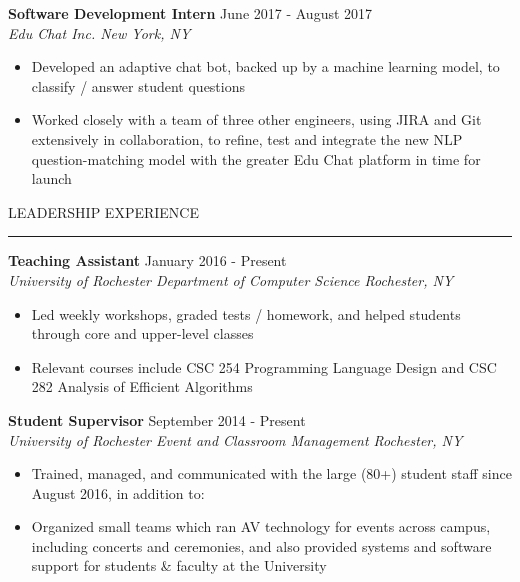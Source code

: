 \documentclass{report}
\begin{document}
\vspace{8pt} \textbf{Software Development Intern} \hfill June 2017 - August 2017 \\
\textit{Edu Chat Inc. \hfill New York, NY}
\begin{itemize} [noitemsep,topsep=4pt] %
	\item Developed an adaptive chat bot, backed up by a machine learning model, to classify / answer student questions
	\item Worked closely with a team of three other engineers, using JIRA and Git extensively in collaboration, to refine, test and integrate the new NLP question-matching model with the greater Edu Chat platform in time for launch
\end{itemize}

\vspace{8pt} LEADERSHIP EXPERIENCE
\vspace{4pt} \textcolor{gray}{\hrule}

\vspace{14pt} \textbf{Teaching Assistant} \hfill January 2016 - Present \\
\textit{University of Rochester Department of Computer Science \hfill Rochester, NY}
\begin{itemize} [noitemsep,topsep=4pt]
	\item Led weekly workshops, graded tests / homework, and helped students through core and upper-level classes
	\item Relevant courses include CSC 254 Programming Language Design and CSC 282 Analysis of Efficient Algorithms 
\end{itemize}

\vspace{8pt} \textbf{Student Supervisor} \hfill September 2014 - Present \\
\textit{University of Rochester Event and Classroom Management \hfill Rochester, NY}
\begin{itemize} [noitemsep,topsep=4pt]
	\item Trained, managed, and communicated with the large (80+) student staff since August 2016, in addition to:
	\item Organized small teams which ran AV technology for events across campus, including concerts and ceremonies, and also provided systems and software support for students \& faculty at the University 
\end{itemize}

\end{document}
